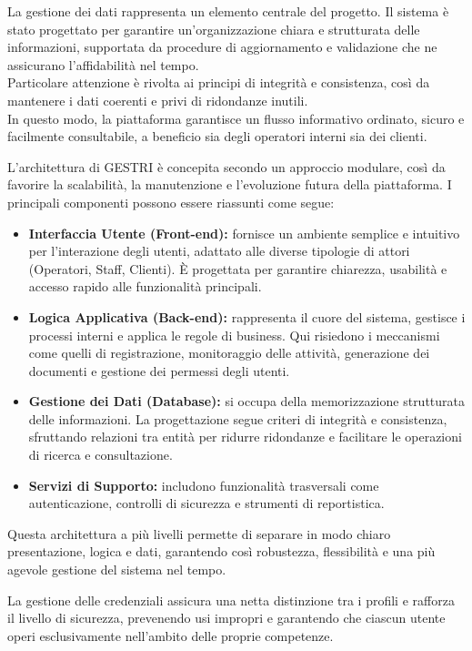 \documentclass[a4paper]{report}
\begin{document}
La gestione dei dati rappresenta un elemento centrale del progetto. 
Il sistema è stato progettato per garantire un’organizzazione chiara e strutturata delle informazioni, supportata da procedure di aggiornamento e validazione che ne assicurano l’affidabilità nel tempo.
\\
Particolare attenzione è rivolta ai principi di integrità e consistenza, così da mantenere i dati coerenti e privi di ridondanze inutili.
\\
In questo modo, la piattaforma garantisce un flusso informativo ordinato, sicuro e facilmente consultabile, a beneficio sia degli operatori interni sia dei clienti.	

L’architettura di GESTRI è concepita secondo un approccio modulare, così da favorire la scalabilità, la manutenzione e l’evoluzione futura della piattaforma. I principali componenti possono essere riassunti come segue:
\begin{itemize}
    \item \textbf{Interfaccia Utente (Front-end):} fornisce un ambiente semplice e intuitivo per l’interazione degli utenti, adattato alle diverse tipologie di attori (Operatori, Staff, Clienti). 
    È progettata per garantire chiarezza, usabilità e accesso rapido alle funzionalità principali.
    \item \textbf{Logica Applicativa (Back-end):} rappresenta il cuore del sistema, gestisce i processi interni e applica le regole di business. 
    Qui risiedono i meccanismi come quelli di registrazione, monitoraggio delle attività, generazione dei documenti e gestione dei permessi degli utenti.
    \item \textbf{Gestione dei Dati (Database):} si occupa della memorizzazione strutturata delle informazioni. 
    La progettazione segue criteri di integrità e consistenza, sfruttando relazioni tra entità per ridurre ridondanze e facilitare le operazioni di ricerca e consultazione.
    \item \textbf{Servizi di Supporto:} includono funzionalità trasversali come autenticazione, controlli di sicurezza e strumenti di reportistica.
\end{itemize}
Questa architettura a più livelli permette di separare in modo chiaro presentazione, logica e dati, garantendo così robustezza, flessibilità e una più agevole gestione del sistema nel tempo.

La gestione delle credenziali assicura una netta distinzione tra i profili e rafforza il livello di sicurezza, prevenendo usi impropri e garantendo che ciascun utente operi esclusivamente nell’ambito delle proprie competenze.
\end{document}
